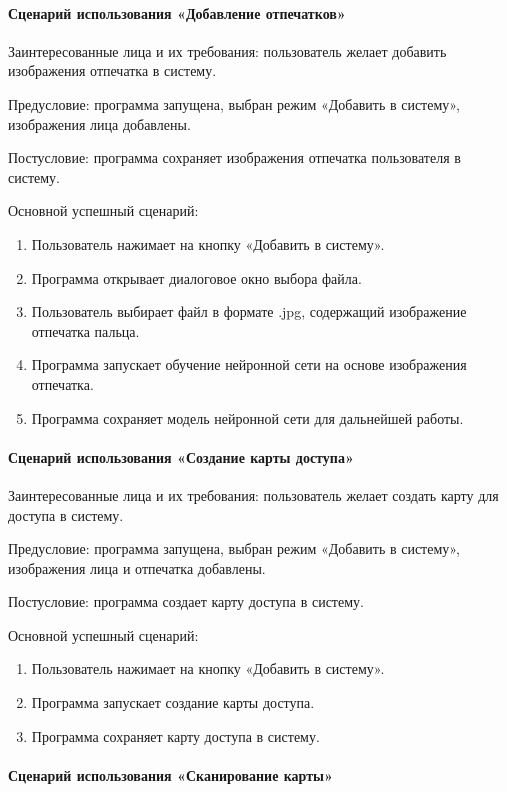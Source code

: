 \paragraph{Сценарий использования «Добавление отпечатков»}

Заинтересованные лица и их требования: пользователь желает добавить изображения отпечатка в систему.

Предусловие: программа запущена, выбран режим «Добавить в систему», изображения лица добавлены.

Постусловие: программа сохраняет изображения отпечатка пользователя в систему.

Основной успешный сценарий:
\begin{enumerate}
	\item Пользователь нажимает на кнопку «Добавить в систему».
	\item Программа открывает диалоговое окно выбора файла.
	\item Пользователь выбирает файл в формате .jpg, содержащий изображение отпечатка пальца.
	\item Программа запускает обучение нейронной сети на основе изображения отпечатка.
	\item Программа сохраняет модель нейронной сети для дальнейшей работы.
\end{enumerate}

\paragraph{Сценарий использования «Создание карты доступа»}

Заинтересованные лица и их требования: пользователь желает создать карту для доступа в систему.

Предусловие: программа запущена, выбран режим «Добавить в систему», изображения лица и отпечатка добавлены.

Постусловие: программа создает карту доступа в систему.

Основной успешный сценарий:
\begin{enumerate}
	\item Пользователь нажимает на кнопку «Добавить в систему».
	\item Программа запускает создание карты доступа.
	\item Программа сохраняет карту доступа в систему.
\end{enumerate}

\paragraph{Сценарий использования «Сканирование карты»}

